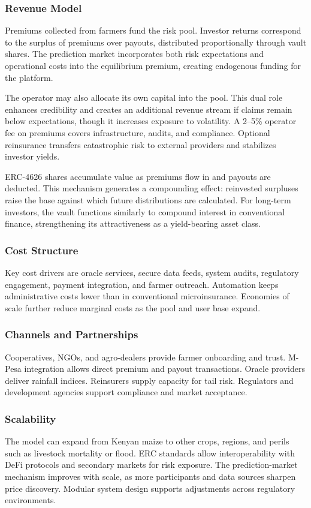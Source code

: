 \documentclass[11pt,a4paper]{article}
\begin{document}
	\subsubsection{Revenue Model}
Premiums collected from farmers fund the risk pool. Investor returns correspond to the surplus of premiums over payouts, distributed proportionally through vault shares. The prediction market incorporates both risk expectations and operational costs into the equilibrium premium, creating endogenous funding for the platform.

The operator may also allocate its own capital into the pool. This dual role enhances credibility and creates an additional revenue stream if claims remain below expectations, though it increases exposure to volatility. A 2--5\% operator fee on premiums covers infrastructure, audits, and compliance. Optional reinsurance transfers catastrophic risk to external providers and stabilizes investor yields.

ERC-4626 shares accumulate value as premiums flow in and payouts are deducted. This mechanism generates a compounding effect: reinvested surpluses raise the base against which future distributions are calculated. For long-term investors, the vault functions similarly to compound interest in conventional finance, strengthening its attractiveness as a yield-bearing asset class.

	\subsubsection{Cost Structure}
Key cost drivers are oracle services, secure data feeds, system audits, regulatory engagement, payment integration, and farmer outreach. Automation keeps administrative costs lower than in conventional microinsurance. Economies of scale further reduce marginal costs as the pool and user base expand.

	\subsubsection{Channels and Partnerships}
Cooperatives, NGOs, and agro-dealers provide farmer onboarding and trust. M-Pesa integration allows direct premium and payout transactions. Oracle providers deliver rainfall indices. Reinsurers supply capacity for tail risk. Regulators and development agencies support compliance and market acceptance.

	\subsubsection{Scalability}
The model can expand from Kenyan maize to other crops, regions, and perils such as livestock mortality or flood. ERC standards allow interoperability with DeFi protocols and secondary markets for risk exposure. The prediction-market mechanism improves with scale, as more participants and data sources sharpen price discovery. Modular system design supports adjustments across regulatory environments.
\end{document}
